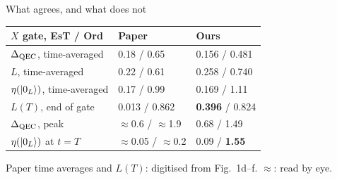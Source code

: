 \begin{frame}{What agrees, and what does not}
  \begin{center}
  \small
  \renewcommand{\arraystretch}{1.2}
  \begin{tabular}{@{}l l l@{}}
    \textbf{$X$ gate, EsT / Ord} & \textbf{Paper} & \textbf{Ours} \\
    \hline
    $\Delta_{\mathrm{QEC}}$, time-averaged      & 0.18 / 0.65     & 0.156 / 0.481 \\
    $L$, time-averaged          & 0.22 / 0.61     & 0.258 / 0.740 \\
    $\eta(\left|0_L\right\rangle)$, time-averaged & 0.17 / 0.99 & 0.169 / 1.11 \\
    \hline
    $L(T)$, end of gate         & 0.013 / 0.862   & \textbf{0.396} / 0.824 \\
    $\Delta_{\mathrm{QEC}}$, peak               & $\approx$0.6 / $\approx$1.9 & 0.68 / 1.49 \\
    $\eta(\left|0_L\right\rangle)$ at $t=T$  & $\approx$0.05 / $\approx$0.2 & 0.09 / \textbf{1.55} \\
    \hline
  \end{tabular}
  \end{center}
  {\color{tagmid}\scriptsize Paper time averages and $L(T)$: digitised from Fig.~1d--f.
  $\approx$: read by eye.}


\end{frame}
